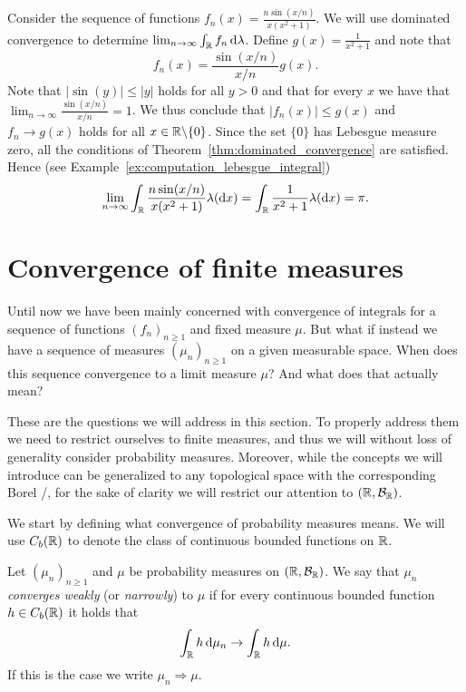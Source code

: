 \begin{example}
Consider the sequence of functions $f_n(x) = \frac{n \sin(x/n)}{x(x^2+1)}$. We will use dominated convergence to determine $\lim_{n \to \infty} \int_{\mathbb R} f_n \, \mathrm{d} \lambda$. Define $g(x) = \frac{1}{x^2 +1}$ and note that 
\[
	f_n(x) = \frac{\sin(x/n)}{x/n} g(x).
\]
Note that $|\sin(y)| \le |y|$ holds for all $y > 0$ and that for every $x$ we have that $\lim_{n \to \infty} \frac{\sin(x/n)}{x/n} = 1$. We thus conclude that $|f_n(x)| \le g(x)$ and $f_n \to g(x)$ holds for all $x \in \mathbb R \backslash \{0\}$. Since the set $\{0\}$ has Lebesgue measure zero, all the conditions of Theorem~\ref{thm:dominated_convergence} are satisfied. Hence (see Example~\ref{ex:computation_lebesgue_integral})
\[
	\lim_{n \to \infty} \int_{\mathbb R} \frac{n \sin(x/n)}{x(x^2+1)} \lambda(\mathrm{d} x) 
	= \int_{\mathbb R} \frac{1}{x^2 +1} \lambda(\mathrm{d} x) = \pi.
\]
\end{example}

\section{Convergence of finite measures}\label{sec:weak_convergence_finite_measures}

Until now we have been mainly concerned with convergence of integrals for a sequence of functions $(f_n)_{n \ge 1}$ and fixed measure $\mu$. But what if instead we have a sequence of measures $(\mu_n)_{n \ge 1}$ on a given measurable space. When does this sequence convergence to a limit measure $\mu$? And what does that actually mean?

These are the questions we will address in this section. To properly address them we need to restrict ourselves to finite measures, and thus we will without loss of generality consider probability measures. Moreover, while the concepts we will introduce can be generalized to any topological space with the corresponding Borel \sigalg/, for the sake of clarity we will restrict our attention to $(\mathbb R, \mathcal B_{\mathbb R})$. 

We start by defining what convergence of probability measures means. We will use $C_b(\mathbb R)$ to denote the class of continuous bounded functions on $\mathbb R$.

\begin{definition}
Let $(\mu_n)_{n \ge 1}$ and $\mu$ be probability measures on $(\mathbb R, \mathcal B_{\mathbb R})$. We say that $\mu_n$ \emph{converges weakly} (or \emph{narrowly}) to $\mu$ if for every continuous bounded function $h\in C_b(\mathbb R)$ it holds that
\[
	\int_{\mathbb R} h \, \mathrm{d} \mu_n \to \int_{\mathbb R} h \, \mathrm{d} \mu.
\]
If this is the case we write $\mu_n \Rightarrow \mu$.
\end{definition}

